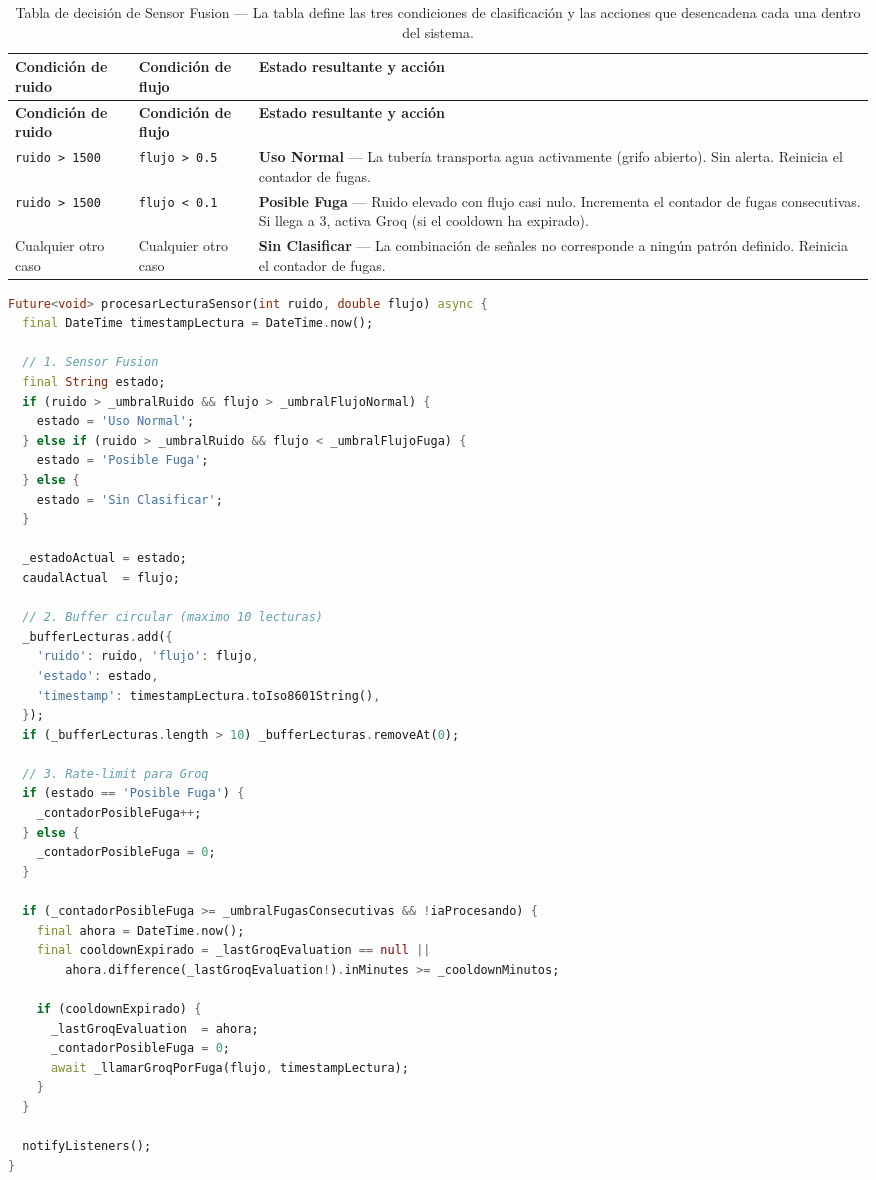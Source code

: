 \documentclass[12pt,a4paper]{article}
\begin{document}
\begin{longtable}{p{3.5cm} p{3.5cm} p{6.5cm}}
\caption{Tabla de decisión de Sensor Fusion --- La tabla define las tres condiciones de
  clasificación y las acciones que desencadena cada una dentro del sistema.}
\label{tab:fusion} \\
\toprule
\textbf{Condición de ruido} & \textbf{Condición de flujo} & \textbf{Estado resultante y acción} \\
\midrule
\endfirsthead
\toprule
\textbf{Condición de ruido} & \textbf{Condición de flujo} & \textbf{Estado resultante y acción} \\
\midrule
\endhead
\bottomrule
\endlastfoot
\texttt{ruido > 1500} & \texttt{flujo > 0.5} &
  \textbf{Uso Normal} --- La tubería transporta agua activamente (grifo abierto).
  Sin alerta. Reinicia el contador de fugas. \\[0.5em]
\texttt{ruido > 1500} & \texttt{flujo < 0.1} &
  \textbf{Posible Fuga} --- Ruido elevado con flujo casi nulo. Incrementa el
  contador de fugas consecutivas. Si llega a 3, activa Groq (si el cooldown
  ha expirado). \\[0.5em]
Cualquier otro caso & Cualquier otro caso &
  \textbf{Sin Clasificar} --- La combinación de señales no corresponde a ningún
  patrón definido. Reinicia el contador de fugas. \\
\end{longtable}

\begin{lstlisting}[language=Dart, caption={Implementación de Sensor Fusion en procesarLecturaSensor()}]
Future<void> procesarLecturaSensor(int ruido, double flujo) async {
  final DateTime timestampLectura = DateTime.now();

  // 1. Sensor Fusion
  final String estado;
  if (ruido > _umbralRuido && flujo > _umbralFlujoNormal) {
    estado = 'Uso Normal';
  } else if (ruido > _umbralRuido && flujo < _umbralFlujoFuga) {
    estado = 'Posible Fuga';
  } else {
    estado = 'Sin Clasificar';
  }

  _estadoActual = estado;
  caudalActual  = flujo;

  // 2. Buffer circular (maximo 10 lecturas)
  _bufferLecturas.add({
    'ruido': ruido, 'flujo': flujo,
    'estado': estado,
    'timestamp': timestampLectura.toIso8601String(),
  });
  if (_bufferLecturas.length > 10) _bufferLecturas.removeAt(0);

  // 3. Rate-limit para Groq
  if (estado == 'Posible Fuga') {
    _contadorPosibleFuga++;
  } else {
    _contadorPosibleFuga = 0;
  }

  if (_contadorPosibleFuga >= _umbralFugasConsecutivas && !iaProcesando) {
    final ahora = DateTime.now();
    final cooldownExpirado = _lastGroqEvaluation == null ||
        ahora.difference(_lastGroqEvaluation!).inMinutes >= _cooldownMinutos;

    if (cooldownExpirado) {
      _lastGroqEvaluation  = ahora;
      _contadorPosibleFuga = 0;
      await _llamarGroqPorFuga(flujo, timestampLectura);
    }
  }

  notifyListeners();
}
\end{lstlisting}
\end{document}
